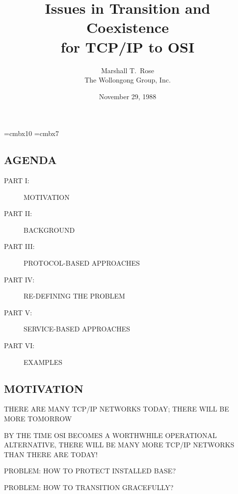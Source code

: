 


\font\xx=cmbx10
\font\yy=cmbx7

\raggedright


\let\tradeNAMfont=\relax
\let\tradeORGfont=\relax



\title	{Issues in Transition and Coexistence\\ for TCP/IP to OSI}
\author	{Marshall T.~Rose\\ The Wollongong Group, Inc.}
\date	{November 29, 1988}
\maketitlepage


\begin{bwslide}
\part*	{AGENDA}\bf

\begin{description}
\item[PART I:]		MOTIVATION

\item[PART II:]		BACKGROUND

\item[PART III:]	PROTOCOL-BASED APPROACHES

\item[PART IV:]		RE-DEFINING THE PROBLEM

\item[PART V:]		SERVICE-BASED APPROACHES

\item[PART VI:]		EXAMPLES
\end{description}
\end{bwslide}


\begin{bwslide}
\part	{MOTIVATION}\bf

\begin{nrtc}
\item	THERE ARE MANY TCP/IP NETWORKS TODAY; THERE WILL BE MORE TOMORROW

\item	BY THE TIME OSI BECOMES A WORTHWHILE OPERATIONAL ALTERNATIVE,
	THERE WILL BE MANY MORE TCP/IP NETWORKS THAN THERE ARE TODAY!

\item	PROBLEM: HOW TO PROTECT INSTALLED BASE?

\item	PROBLEM: HOW TO TRANSITION GRACEFULLY?
\end{nrtc}
\end{bwslide}


